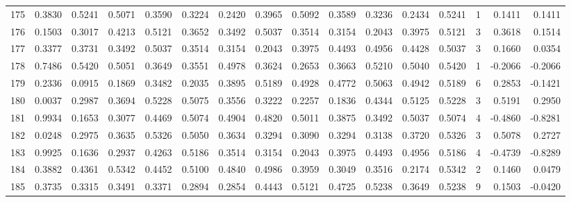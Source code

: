 \begin{tabular}{lrrrrrrrrrrrrrrr}
175 &      0.3830 &  0.5241 &  0.5071 &  0.3590 &  0.3224 &  0.2420 &  0.3965 &  0.5092 &  0.3589 &  0.3236 &   0.2434 &     0.5241 &      1 &                    0.1411 &                     0.1411 \\
176 &      0.1503 &  0.3017 &  0.4213 &  0.5121 &  0.3652 &  0.3492 &  0.5037 &  0.3514 &  0.3154 &  0.2043 &   0.3975 &     0.5121 &      3 &                    0.3618 &                     0.1514 \\
177 &      0.3377 &  0.3731 &  0.3492 &  0.5037 &  0.3514 &  0.3154 &  0.2043 &  0.3975 &  0.4493 &  0.4956 &   0.4428 &     0.5037 &      3 &                    0.1660 &                     0.0354 \\
178 &      0.7486 &  0.5420 &  0.5051 &  0.3649 &  0.3551 &  0.4978 &  0.3624 &  0.2653 &  0.3663 &  0.5210 &   0.5040 &     0.5420 &      1 &                   -0.2066 &                    -0.2066 \\
179 &      0.2336 &  0.0915 &  0.1869 &  0.3482 &  0.2035 &  0.3895 &  0.5189 &  0.4928 &  0.4772 &  0.5063 &   0.4942 &     0.5189 &      6 &                    0.2853 &                    -0.1421 \\
180 &      0.0037 &  0.2987 &  0.3694 &  0.5228 &  0.5075 &  0.3556 &  0.3222 &  0.2257 &  0.1836 &  0.4344 &   0.5125 &     0.5228 &      3 &                    0.5191 &                     0.2950 \\
181 &      0.9934 &  0.1653 &  0.3077 &  0.4469 &  0.5074 &  0.4904 &  0.4820 &  0.5011 &  0.3875 &  0.3492 &   0.5037 &     0.5074 &      4 &                   -0.4860 &                    -0.8281 \\
182 &      0.0248 &  0.2975 &  0.3635 &  0.5326 &  0.5050 &  0.3634 &  0.3294 &  0.3090 &  0.3294 &  0.3138 &   0.3720 &     0.5326 &      3 &                    0.5078 &                     0.2727 \\
183 &      0.9925 &  0.1636 &  0.2937 &  0.4263 &  0.5186 &  0.3514 &  0.3154 &  0.2043 &  0.3975 &  0.4493 &   0.4956 &     0.5186 &      4 &                   -0.4739 &                    -0.8289 \\
184 &      0.3882 &  0.4361 &  0.5342 &  0.4452 &  0.5100 &  0.4840 &  0.4986 &  0.3959 &  0.3049 &  0.3516 &   0.2174 &     0.5342 &      2 &                    0.1460 &                     0.0479 \\
185 &      0.3735 &  0.3315 &  0.3491 &  0.3371 &  0.2894 &  0.2854 &  0.4443 &  0.5121 &  0.4725 &  0.5238 &   0.3649 &     0.5238 &      9 &                    0.1503 &                    -0.0420 \\

\end{tabular}
